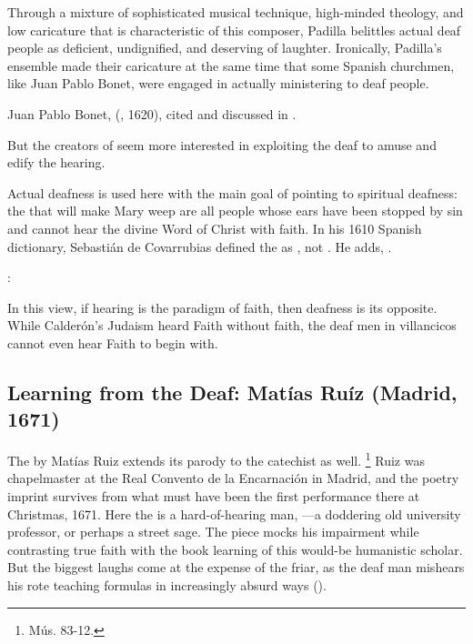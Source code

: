 Through a mixture of sophisticated musical technique, high-minded theology, and low caricature that is characteristic of this composer, Padilla belittles actual deaf people as deficient, undignified, and deserving of laughter.
Ironically, Padilla's ensemble made their caricature at the same time that some Spanish churchmen, like Juan Pablo Bonet, were engaged in actually ministering to deaf people.%
\begin{Footnote}
  Juan Pablo Bonet,  (\XXX, 1620), cited and discussed in \autocite{Plann:DeafEducationSpain}.
\end{Footnote}
But the creators of  seem more interested in exploiting the deaf to amuse and edify the hearing.

Actual deafness is used here with the main goal of pointing to spiritual deafness: the  that will make Mary weep are all people whose ears have been stopped by sin and cannot hear the divine Word of Christ with faith.
In his 1610 Spanish dictionary, Sebastián de Covarrubias defined the  as , not .
He adds, .%
\begin{Footnote}
  \Autocite[]{Covarrubias:Tesoro}:
\end{Footnote}
In this view, if hearing is the paradigm of faith, then deafness is its opposite.
While Calderón's Judaism heard Faith without faith, the deaf men in villancicos cannot even hear Faith to begin with.

\subsection{Learning from the Deaf: Matías Ruíz (Madrid, 1671)}

The  by Matías Ruiz extends its parody to the catechist as well.%
\footnote{\signature{E-E}{Mús. 83-12}.}
Ruiz was chapelmaster at the Real Convento de la Encarnación in Madrid, and the poetry imprint survives from what must have been the first performance there at Christmas, 1671.%
\autocite{1671-Madrid-Enc-Nav}
Here the  is a hard-of-hearing man, ---a doddering old university professor, or perhaps a street sage.
The piece mocks his impairment while contrasting true faith with the book learning of this would-be humanistic scholar.
But the biggest laughs come at the expense of the friar, as the deaf man mishears his rote teaching formulas in increasingly absurd ways ().

